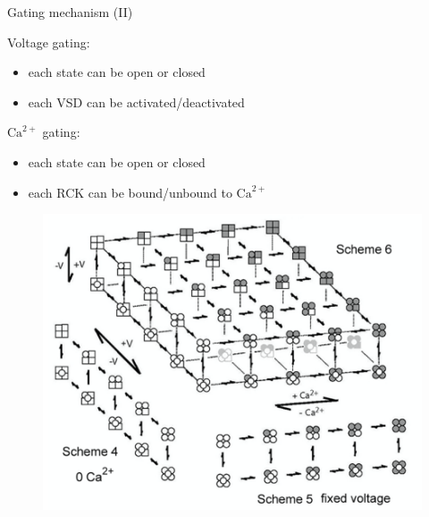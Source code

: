 \documentclass{beamer}
\newcommand{\ca}{\text{Ca}^{2+}}
\begin{document}
\begin{frame}{Gating mechanism (II)}
\begin{minipage}{.46\textwidth}
Voltage gating:
\begin{itemize}
	\item each state can be open or closed
	\item each VSD can be activated/deactivated
\end{itemize}
\bigskip
$\ca$ gating:
\begin{itemize}
	\item each state can be open or closed
	\item each RCK can be bound/unbound to $\ca$
\end{itemize}
\end{minipage}
\begin{minipage}{.52\textwidth}
\begin{figure}
\centering
\includegraphics[width=\textwidth]{50_State_Model.png}
\end{figure}
\end{minipage}
\end{frame}
\end{document}
